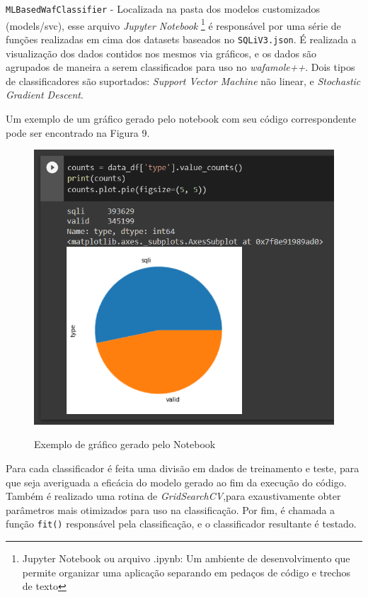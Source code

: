 \begin{alineas}
\begin{alineas}
\end{alineas}
\item \verb+MLBasedWafClassifier+ - Localizada na pasta dos modelos customizados (models/svc), esse arquivo \textit{Jupyter Notebook} \footnote{Jupyter Notebook ou arquivo .ipynb: Um ambiente de desenvolvimento que permite organizar uma aplicação separando em pedaços de código e trechos de texto} é responsável por uma série de funções realizadas em cima dos datasets baseados no \verb+SQLiV3.json+. É realizada a visualização dos dados contidos nos mesmos via gráficos, e os dados são agrupados de maneira a serem classificados para uso no \textit{wafamole++}. Dois tipos de classificadores são suportados: \textit{Support Vector Machine} não linear, e \textit{Stochastic Gradient Descent}. 

Um exemplo de um gráfico gerado pelo notebook com seu código correspondente pode ser encontrado na Figura 9.

\begin{figure}[ht]
    \centering
    \caption{Exemplo de gráfico gerado pelo Notebook}
    \includegraphics[width=16cm]{figuras/exemplo_grafico_notebook.png} 
    \label{fig:internet} 
\end{figure}

Para cada classificador é feita uma divisão em dados de treinamento e teste, para que seja averiguada a eficácia do modelo gerado ao fim da execução do código. Também é realizado uma rotina de \textit{GridSearchCV},para exaustivamente obter parâmetros mais otimizados para uso na classificação. Por fim, é chamada a função \verb+fit()+ responsável pela classificação, e o classificador resultante é testado. 


\end{alineas}
